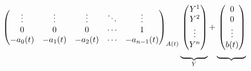 \documentclass[../notes.tex]{subfiles}
\begin{document}
\begin{itemize}
\begin{itemize}
\begin{align*}
{\begin{pmatrix}
                    \vdots & \vdots & \vdots & \ddots & \vdots\\
                    0 & 0 & 0 & \cdots & 1\\
                    -a_0(t) & -a_1(t) & -a_2(t) & \cdots & -a_{n-1}(t)\\
                \end{pmatrix}
            }_{A(t)}\underbrace{
                \vphantom{
                    \begin{pmatrix}
                        0 & 1 & 0 & \cdots & 0\\
                        0 & 0 & 1 & \cdots & 0\\
                        \vdots & \vdots & \vdots & \ddots & \vdots\\
                        0 & 0 & 0 & \cdots & 1\\
                        -a_0(t) & -a_1(t) & -a_2(t) & \cdots & -a_{n-1}(t)\\
                    \end{pmatrix}
                }
                \begin{pmatrix}
                    Y^1\\
                    Y^2\\
                    \vdots\\
                    Y^n\\
                \end{pmatrix}
            }_Y+\underbrace{
                \vphantom{
                    \begin{pmatrix}
                        0 & 1 & 0 & \cdots & 0\\
                        0 & 0 & 1 & \cdots & 0\\
                        \vdots & \vdots & \vdots & \ddots & \vdots\\
                        0 & 0 & 0 & \cdots & 1\\
                        -a_0(t) & -a_1(t) & -a_2(t) & \cdots & -a_{n-1}(t)\\
                    \end{pmatrix}
                }
                \begin{pmatrix}
                    0\\
                    0\\
                    \vdots\\
                    b(t)\\
                \end{pmatrix}
}
\end{align*}
\end{itemize}
\end{itemize}
\end{document}
